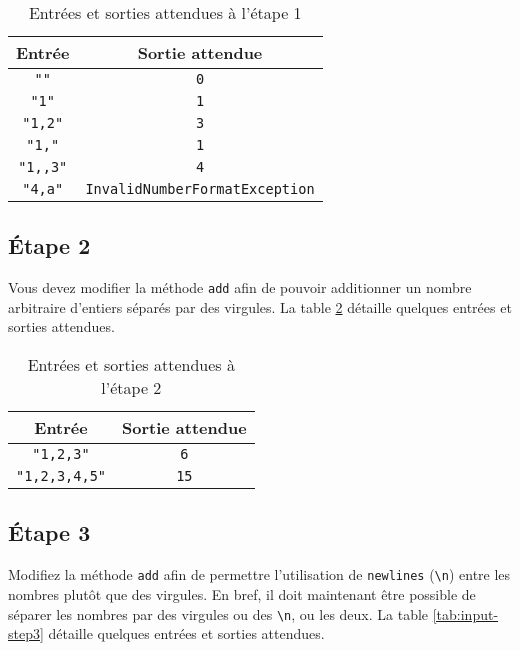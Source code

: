 \documentclass[french]{article}
\begin{document}
\begin{table}[h]
    \centering
    \begin{tabular}{|c|c|}
        \hline
        \textbf{Entrée} & \textbf{Sortie attendue} \\\hline\hline
        \texttt{""}     & \texttt{0} \\\hline
        \texttt{"1"}    & \texttt{1} \\\hline
        \texttt{"1,2"}  & \texttt{3} \\\hline
        \texttt{"1,"}   & \texttt{1} \\\hline
        \texttt{"1,,3"} & \texttt{4} \\\hline
        \texttt{"4,a"}  & \texttt{InvalidNumberFormatException} \\\hline
    \end{tabular}
    \caption{Entrées et sorties attendues à l'étape 1}
    \label{tab:input-step1}
\end{table}

\subsection{Étape 2}
Vous devez modifier la méthode \texttt{add} afin de pouvoir additionner un nombre arbitraire d'entiers séparés par des virgules. La table \ref{tab:input-step2} détaille quelques entrées et sorties attendues.

\begin{table}[h]
    \centering
    \begin{tabular}{|c|c|}
        \hline
        \textbf{Entrée}      & \textbf{Sortie attendue} \\\hline\hline
        \texttt{"1,2,3"}     & \texttt{6} \\\hline
        \texttt{"1,2,3,4,5"} & \texttt{15} \\\hline
    \end{tabular}
    \caption{Entrées et sorties attendues à l'étape 2}
    \label{tab:input-step2}
\end{table}

\subsection{Étape 3}
Modifiez la méthode \texttt{add} afin de permettre l'utilisation de \texttt{newlines} (\texttt{\textbackslash n}) entre les nombres plutôt que des virgules. En bref, il doit maintenant être possible de séparer les nombres par des virgules ou des \texttt{\textbackslash n}, ou les deux. La table \ref{tab:input-step3} détaille quelques entrées et sorties attendues.
\end{document}
